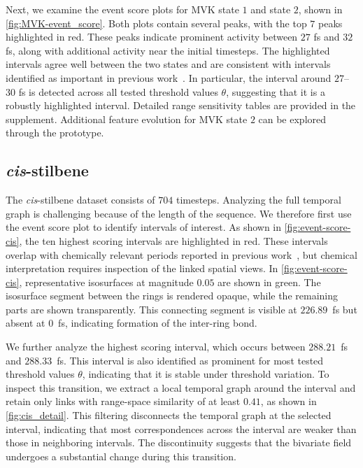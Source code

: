 \documentclass[review]{vgtc}                          %
\begin{document}
Next, we examine the event score plots for MVK state $1$ and state $2$, shown in \autoref{fig:MVK-event_score}. Both plots contain several peaks, with the top $7$ peaks highlighted in red. These peaks indicate prominent activity between $27$ fs and $32$ fs, along with additional activity near the initial timesteps. The highlighted intervals agree well between the two states and are consistent with intervals identified as important in previous work~\cite{Florian2024,Sharma2025}. In particular, the interval around $27$--$30$ fs is detected across all tested threshold values $\theta$, suggesting that it is a robustly highlighted interval. Detailed range sensitivity tables are provided in the supplement. Additional feature evolution for MVK state $2$ can be explored through the prototype.






\subsection{\textit{cis}-stilbene}

The \textit{cis}-stilbene dataset consists of $704$ timesteps. Analyzing the full temporal graph is challenging because of the length of the sequence. We therefore first use the event score plot to identify intervals of interest. As shown in \autoref{fig:event-score-cis}, the ten highest scoring intervals are highlighted in red.  These intervals overlap with chemically relevant periods reported in previous work~\cite{sharma2025_operators}, but chemical interpretation requires inspection of the linked spatial views. In \autoref{fig:event-score-cis}, representative isosurfaces at magnitude $0.05$ are shown in green. The isosurface segment between the rings is rendered opaque, while the remaining parts are shown transparently. This connecting segment is visible at $226.89$~fs but absent at $0$~fs, indicating formation of the inter-ring bond.



We further analyze the highest scoring interval, which occurs between $288.21$~fs and $288.33$~fs. This interval is also identified as prominent for most tested threshold values $\theta$, indicating that it is stable under threshold variation. To inspect this transition, we extract a local temporal graph around the interval and retain only links with range-space similarity of at least $0.41$, as shown in \autoref{fig:cis_detail}. This filtering disconnects the temporal graph at the selected interval, indicating that most correspondences across the interval are weaker than those in neighboring intervals. The discontinuity suggests that the bivariate field undergoes a substantial change during this transition.
\end{document}
